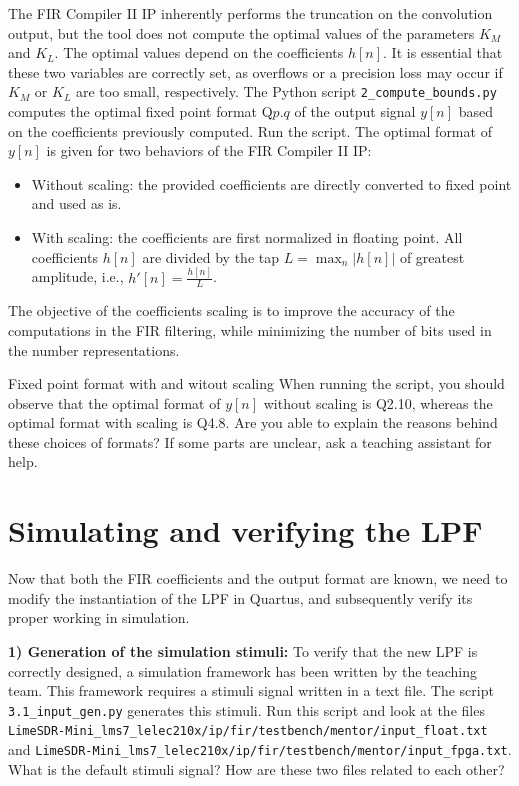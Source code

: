 The FIR Compiler II IP inherently performs the truncation on the convolution output, but the tool does not compute the optimal values of the parameters $K_M$ and $K_L$. The optimal values depend on the coefficients $h[n]$. It is essential that these two variables are correctly set, as overflows or a precision loss may occur if $K_M$ or $K_L$ are too small, respectively.
The Python script \texttt{2\_compute\_bounds.py} computes the optimal fixed point format Q$p.q$ of the output signal $y[n]$ based on the coefficients previously computed. Run the script. The optimal format of $y[n]$ is given for two behaviors of the FIR Compiler II IP:
\begin{itemize}
    \item Without scaling: the provided coefficients are directly converted to fixed point and used as is.
    \item With scaling: the coefficients are first normalized in floating point. All coefficients $h[n]$ are divided by the tap $L = \max_n \left| h[n] \right|$ of greatest amplitude, i.e., $h'[n] = \frac{h[n]}{L}$.
\end{itemize}
The objective of the coefficients scaling is to improve the accuracy of the computations in the FIR filtering, while minimizing the number of bits used in the number representations.

\begin{bclogo}[couleur = gray!20, arrondi = 0.2, logo=\bcinfo]{Fixed point format with and witout scaling}
    When running the script, you should observe that the optimal format of $y[n]$ without scaling is Q2.10, whereas the optimal format with scaling is Q4.8. Are you able to explain the reasons behind these choices of formats? If some parts are unclear, ask a teaching assistant for help.
\end{bclogo}

\section{Simulating and verifying the LPF}

Now that both the FIR coefficients and the output format are known, we need to modify the instantiation of the LPF in Quartus, and subsequently verify its proper working in simulation.

\textbf{1) Generation of the simulation stimuli:}
To verify that the new LPF is correctly designed, a simulation framework has been written by the teaching team.
This framework requires a stimuli signal written in a text file. The script \texttt{3.1\_input\_gen.py} generates this stimuli. Run this script and look at the files
\texttt{LimeSDR-Mini\_lms7\_lelec210x/ip/fir/testbench/mentor/input\_float.txt} and
\texttt{LimeSDR-Mini\_lms7\_lelec210x/ip/fir/testbench/mentor/input\_fpga.txt}. What is the default stimuli signal? How are these two files related to each other?

